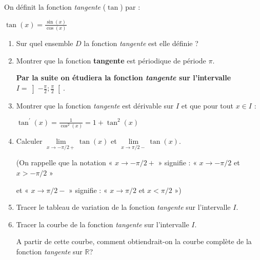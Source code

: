 
%
On définit la fonction \textit{tangente} ($\tan$) par : 

\begin{center}
$\tan\left(x\right)=\frac{\sin\left(x\right)}{\cos\left(x\right)}$
\end{center}
\begin{enumerate}
     \item
     Sur quel ensemble $D$ la fonction \textit{tangente} est elle définie ?
     \item
     Montrer que la fonction \textbf{tangente} est périodique de période $\pi $.
\par
      \textbf{Par la suite on étudiera la fonction \textit{tangente} sur l'intervalle } $I=\left]-\frac{\pi }{2} ; \frac{\pi }{2}\right[$.
     \item
     Montrer que la fonction \textit{tangente} est dérivable sur $I$ et que pour tout $x \in  I$ :
     \begin{center}$\tan^{\prime}\left(x\right)=\frac{1}{\cos^{2}\left(x\right)}=1+\tan^{2}\left(x\right)$\end{center}
     \item
     Calculer $\lim\limits_{x\rightarrow -\pi /2+}\tan\left(x\right)$ et $\lim\limits_{x\rightarrow \pi /2-}\tan\left(x\right)$.
     \par
     (On rappelle que la notation « $x\rightarrow -\pi /2+$ » signifie : « $x\rightarrow -\pi /2$ et $x > -\pi /2$ »
     \par
     et « $x\rightarrow \pi /2-$ » signifie : « $x\rightarrow \pi /2$ et $x < \pi /2$ »)
     \item
     Tracer le tableau de variation de la fonction \textit{tangente} sur l'intervalle $I$.
     \item
     Tracer la courbe de la fonction \textit{tangente} sur l'intervalle $I$.
     \par
     A partir de cette courbe, comment obtiendrait-on la courbe complète de la fonction \textit{tangente} sur $\mathbb{R}$?
\end{enumerate}
\begin{corrige}

\end{corrige}

